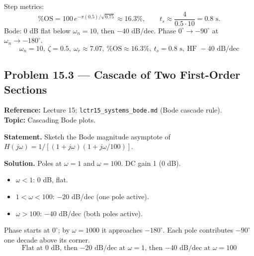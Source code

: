 \documentclass[11pt]{article}
\begin{document}
Step metrics:
\[
\%\mathrm{OS} = 100\, e^{-\pi(0.5)/\sqrt{0.75}}\approx 16.3\%,\qquad t_s\approx \frac{4}{0.5\cdot 10} = 0.8\text{ s}.
\]
Bode: 0 dB flat below $\omega_n=10$, then $-40$ dB/dec. Phase $0^\circ\to -90^\circ$ at $\omega_n\to -180^\circ$.
\[
\boxed{\,\omega_n = 10,\ \zeta = 0.5,\ \omega_r\approx 7.07,\ \%\mathrm{OS}\approx 16.3\%,\ t_s=0.8\text{ s},\ \text{HF }-40\text{ dB/dec}\,}
\]

\subsection{Problem 15.3 --- Cascade of Two First-Order Sections}
\textbf{Reference:} Lecture 15; \texttt{lctr15\_systems\_bode.md} (Bode cascade rule).\\
\textbf{Topic:} Cascading Bode plots.

\textbf{Statement.} Sketch the Bode magnitude asymptote of $H(j\omega) = 1/[(1+j\omega)(1+j\omega/100)]$.

\textbf{Solution.}
Poles at $\omega=1$ and $\omega=100$. DC gain 1 (0 dB).
\begin{itemize}[leftmargin=*]
  \item $\omega<1$: 0 dB, flat.
  \item $1<\omega<100$: $-20$ dB/dec (one pole active).
  \item $\omega>100$: $-40$ dB/dec (both poles active).
\end{itemize}
Phase starts at $0^\circ$; by $\omega=1000$ it approaches $-180^\circ$. Each pole contributes $-90^\circ$ one decade above its corner.
\[
\boxed{\,\text{Flat at 0 dB, then $-20$ dB/dec at $\omega=1$, then $-40$ dB/dec at $\omega=100$}\,}
\]
\end{document}
